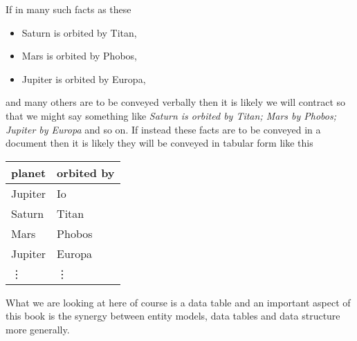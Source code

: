 If in  many such facts as these
\begin{itemize}
\renewcommand\labelitemi{--} 
\item Saturn is orbited by Titan, 
\item Mars is orbited by Phobos, 
\item Jupiter is orbited by Europa,
\end{itemize}
and many others are to be conveyed verbally then it is likely we will contract so that we might say something like
\textit{Saturn is orbited by Titan; Mars by Phobos; Jupiter by Europa} and so on.
If instead  these facts are to be conveyed in a document then
it is likely they will be conveyed in tabular form like this
\begin{center}
\begin{tabular}{|l | l|}
\hline
planet & orbited by \\
\hline\hline
Jupiter  & Io \\
\hline
Saturn   & Titan    \\
\hline
Mars     & Phobos    \\
\hline
Jupiter  & Europa         \\
\hline
\vdots    & \vdots  \\
\hline
\end{tabular}
\end{center}

What we are looking at here of course is a data table and an important aspect of this book is the synergy between  entity models, data tables and data structure more generally.

